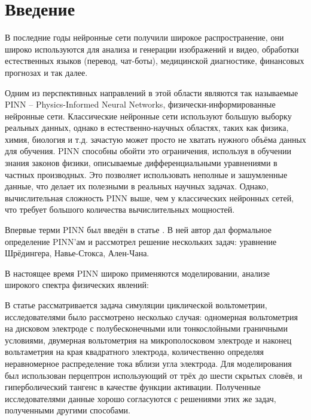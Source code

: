 \documentclass[a4paper,12pt]{article} %
\author{Кузнецов Игорь}
\title{}
\date{\today}
\begin{document}
\newcommand{\brv}[1]{{\left| #1 \right|}}
\newcommand{\brr}[1]{{\left( #1 \right)}}
\newcommand{\brs}[1]{{\left[ #1 \right]}}
\newcommand{\brc}[1]{{\left\{ #1 \right\}}}
\newcommand{\brn}[1]{{\left\lVert #1 \right\rVert}}
\newcommand{\bra}[1]{{\left\langle #1 \right\rangle}}
\newcommand{\brrl}[1]{{\left( #1 \right]}}
            \newcommand{\brrr}[1]{{\left[ #1 \right)}}
\newcommand{\under}[2]{{\underset{#2}{\underbrace{#1}}}}
\newcommand{\strm}[1]{\underset{#1}{\rightarrow}}

\tableofcontents
\newpage

\section{Введение}

В последние годы нейронные сети получили широкое распространение, они широко используются для анализа и генерации изображений и видео, обработки естественных языков (перевод, чат-боты), медицинской диагностике, финансовых прогнозах и так далее.

Одним из перспективных направлений в этой области являются так называемые PINN -- Physics-Informed Neural Networks, физически-инфор\-мированные нейронные сети. Классические нейронные сети используют большую выборку реальных данных, однако в естественно-научных областях, таких как физика, химия, биология и т.д. зачастую может просто не хватать нужного объёма данных для обучения. PINN способны обойти это ограничения, используя в обучении знания законов физики, описываемые дифференциальными уравнениями в частных производных. Это позволяет использовать неполные и зашумленные данные, что делает их полезными в реальных научных задачах. Однако, вычислительная сложность PINN выше, чем у классических нейронных сетей, что требует большого количества вычислительных мощностей. 

Впервые терми PINN был введён в статье \cite{bib:pinn:first}. В ней автор дал формальное определение PINN'ам и рассмотрел решение нескольких задач: уравнение Шрёдингера, Навье-Стокса, Ален-Чана.

В настоящее время PINN широко применяются моделировании, анализе широкого спектра физических явлений:

В статье \cite{bib:voltogr:1} рассматривается задача симуляции циклической вольтометрии, исследователями было рассмотрено несколько случая: одномерная вольтометрия на дисковом электроде с полубесконечными или тонкослойными граничными условиями, двумерная вольтометрия на микрополосковом электроде и наконец вольтаметрия на края квадратного электрода, количественно определяя неравномерное распределение тока вблизи угла электрода. Для моделирования был использован перцептрон использующий от трёх до шести скрытых словёв, и гиперболический тангенс в качестве функции активации. Полученные исследователями данные хорошо согласуются с решениями этих же задач, полученными другими способами.
\end{document}
